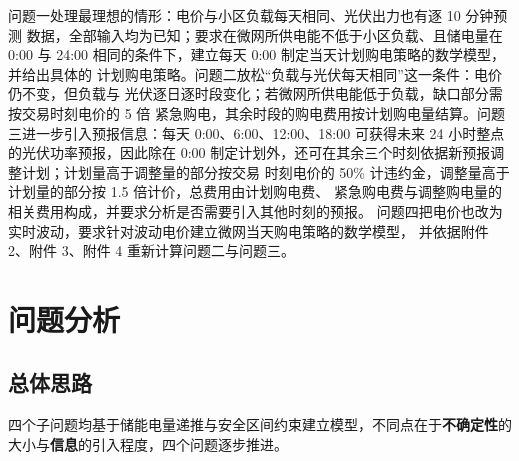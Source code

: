 \documentclass[withoutpreface]{cumcmthesis}
\renewcommand{\emph}[1]{\textbf{#1}}
\begin{document}
问题一处理最理想的情形：电价与小区负载每天相同、光伏出力也有逐 10 分钟预测
数据，全部输入均为已知；要求在微网所供电能不低于小区负载、且储电量在 0:00 与
24:00 相同的条件下，建立每天 0:00 制定当天计划购电策略的数学模型，并给出具体的
计划购电策略。问题二放松“负载与光伏每天相同”这一条件：电价仍不变，但负载与
光伏逐日逐时段变化；若微网所供电能低于负载，缺口部分需按交易时刻电价的 5 倍
紧急购电，其余时段的购电费用按计划购电量结算。问题三进一步引入预报信息：每天
0:00、6:00、12:00、18:00 可获得未来 24 小时整点的光伏功率预报，因此除在 0:00
制定计划外，还可在其余三个时刻依据新预报调整计划；计划量高于调整量的部分按交易
时刻电价的 50\% 计违约金，调整量高于计划量的部分按 1.5 倍计价，总费用由计划购电费、
紧急购电费与调整购电量的相关费用构成，并要求分析是否需要引入其他时刻的预报。
问题四把电价也改为实时波动，要求针对波动电价建立微网当天购电策略的数学模型，
并依据附件 2、附件 3、附件 4 重新计算问题二与问题三。


\section{问题分析}

\subsection{总体思路}

四个子问题均基于储能电量递推与安全区间约束建立模型，不同点在于\emph{不确定性}的大小与\emph{信息}的引入程度，四个问题逐步推进。
\end{document}
